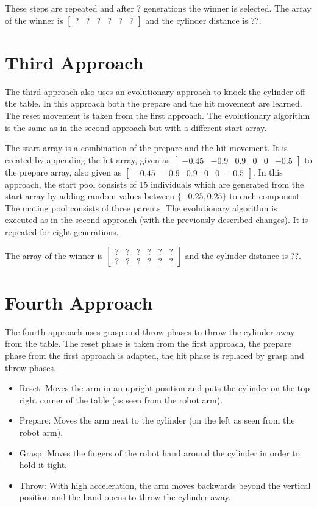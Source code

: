 \documentclass[10pt,twocolumn,letterpaper]{article}
\begin{document}
These steps are repeated and after ? generations the winner is selected. The array of the winner is 
				$\begin{bmatrix}
				? & ? & ? & ? & ? & ?
				\end{bmatrix}$
and the cylinder distance is ??.

\section{Third Approach} \label{sec:thirdApproach}

The third approach also uses an evolutionary approach to knock the cylinder off the table. In this approach both the prepare and the hit movement are learned. The reset movement is taken from the first approach. The evolutionary algorithm is the same as in the second approach but with a different start array. 

The start array is a combination of the prepare and the hit movement. It is  created by appending the hit array, given as  
$\begin{bmatrix}
-0.45 &  -0.9 & 0.9 & 0 & 0 & -0.5
\end{bmatrix}$ 
to the prepare array, also given as
$\begin{bmatrix}
-0.45 &  -0.9 & 0.9 & 0 & 0 & -0.5
\end{bmatrix}$.
In this approach, the start pool consists of 15 individuals which are generated from the start array by adding random values between $\{-0.25,0.25\}$ to each component. The mating pool consists of three parents.
The evolutionary algorithm is executed as in the second approach (with the previously described changes). It is repeated for eight generations. 

The array of the winner is 
				$\begin{bmatrix}
				? & ? & ? & ? & ? & ? \\ ? & ? & ? & ? & ? & ?
				\end{bmatrix}$
and the cylinder distance is ??.

\section{Fourth Approach} \label{sec:fourthApproach}

The fourth approach uses grasp and throw phases to throw the cylinder away from the table. The reset phase is taken from the first approach, the prepare phase from the first approach is adapted, the hit phase is replaced by grasp and throw phases.
\begin{itemize}
\item Reset: Moves the arm in an upright position and puts the cylinder on the top right corner of the table (as seen from the robot arm).
\item Prepare: Moves the arm next to the cylinder (on the left as seen from the robot arm).
\item Grasp: Moves the fingers of the robot hand around the cylinder in order to hold it tight.
\item Throw: With high acceleration, the arm moves backwards beyond the vertical position and the hand opens to throw the cylinder away.
\end{itemize}
\end{document}
